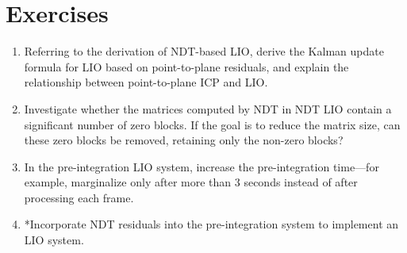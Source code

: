 \section*{Exercises}  
\begin{enumerate}  
	\item Referring to the derivation of NDT-based LIO, derive the Kalman update formula for LIO based on point-to-plane residuals, and explain the relationship between point-to-plane ICP and LIO.  
	\item Investigate whether the matrices computed by NDT in NDT LIO contain a significant number of zero blocks. If the goal is to reduce the matrix size, can these zero blocks be removed, retaining only the non-zero blocks?  
	\item In the pre-integration LIO system, increase the pre-integration time—for example, marginalize only after more than 3 seconds instead of after processing each frame.  
	\item *Incorporate NDT residuals into the pre-integration system to implement an LIO system.  
\end{enumerate}

